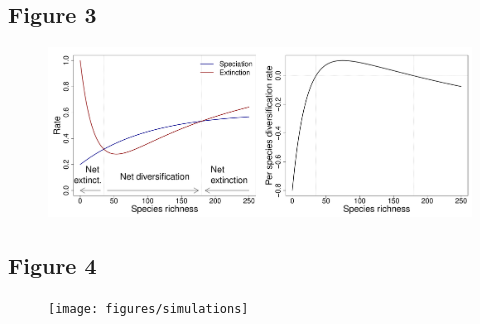 \documentclass[12pt]{article}
\begin{document}
\newpage

\subsection*{Figure 3}

\begin{figure}[ht!]
\centering\includegraphics[width=1\textwidth]{figures/predation}
\end{figure}

\newpage

\subsection*{Figure 4}

\begin{figure}[ht!]
\centering\texttt{[image: figures/simulations]}
\end{figure}

\newpage


\end{document}
